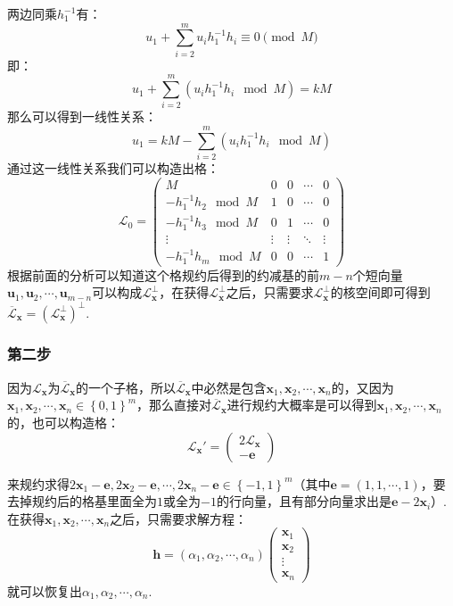 \documentclass{book}
\numberwithin{equation}{subsubsection}
\begin{document}
两边同乘$h_1^{-1}$有：
\begin{equation}
    u_1+\sum_{i=2}^mu_ih_{1}^{-1}h_i\equiv0\pmod{M}
    \nonumber
\end{equation}
即：
\begin{equation}
    u_1+\sum_{i=2}^m(u_ih_{1}^{-1}h_i\mod{M})=kM
    \nonumber
\end{equation}
那么可以得到一线性关系：
\begin{equation}
    u_1=kM-\sum_{i=2}^m(u_ih_{1}^{-1}h_i\mod{M})
    \nonumber
\end{equation}
通过这一线性关系我们可以构造出格：
\begin{equation}
    \mathcal{L}_0=\left(\begin{matrix}
        M&0&0&\cdots&0\\
        -h_1^{-1}h_2\mod{M}&1&0&\cdots&0\\
        -h_1^{-1}h_3\mod{M}&0&1&\cdots&0\\
        \vdots&\vdots&\vdots&\ddots&\vdots\\
        -h_1^{-1}h_m\mod{M}&0&0&\cdots&1
    \end{matrix}\right)
    \nonumber
\end{equation}
根据前面的分析可以知道这个格规约后得到的约减基的前$m-n$个短向量$\pmb{u}_1,\pmb{u}_2,\cdots,\pmb{u}_{m-n}$可以构成$\mathcal{L}_{\pmb{x}}^{\bot}$，在获得$\mathcal{L}_{\pmb{x}}^{\bot}$之后，只需要求$\mathcal{L}_{\pmb{x}}^{\bot}$的核空间即可得到$\overline{\mathcal{L}}_{\pmb{x}}=(\mathcal{L}_{\pmb{x}}^{\bot})^{\bot}$.

\subsubsection*{第二步}
因为$\mathcal{L}_{\pmb{x}}$为$\overline{\mathcal{L}}_{\pmb{x}}$的一个子格，所以$\overline{\mathcal{L}}_{\pmb{x}}$中必然是包含$\pmb{x}_1,\pmb{x}_2,\cdots,\pmb{x}_n$的，又因为$\pmb{x}_1,\pmb{x}_2,\cdots,\pmb{x}_n\in\left\{0,1\right\}^m$，那么直接对$\overline{\mathcal{L}}_{\pmb{x}}$进行规约大概率是可以得到$\pmb{x}_1,\pmb{x}_2,\cdots,\pmb{x}_n$的，也可以构造格：
\begin{equation}
    \mathcal{L}_{\pmb{x}}'=\left(\begin{matrix}2\mathcal{L_{\pmb{x}}}\\-\pmb{e}\end{matrix}\right)
    \nonumber
\end{equation}

来规约求得$2\pmb{x}_1-\pmb{e},2\pmb{x}_2-\pmb{e},\cdots,2\pmb{x}_n-\pmb{e}\in\left\{-1,1\right\}^m$（其中$\pmb{e}=(1,1,\cdots,1)$，要去掉规约后的格基里面全为$1$或全为$-1$的行向量，且有部分向量求出是$\pmb{e}-2\pmb{x}_i$）. 在获得$\pmb{x}_1,\pmb{x}_2,\cdots,\pmb{x}_n$之后，只需要求解方程：
\begin{equation}
    \pmb{h}=(\alpha_1,\alpha_2,\cdots,\alpha_n)\left(\begin{matrix}\pmb{x}_1\\\pmb{x}_2\\\vdots\\\pmb{x}_n\end{matrix}\right)
    \nonumber
\end{equation}
就可以恢复出$\alpha_1,\alpha_2,\cdots,\alpha_n$.
\end{document}
